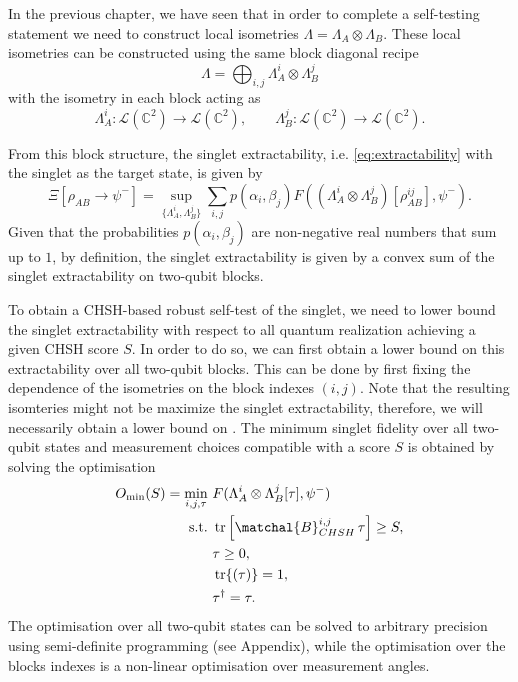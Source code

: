 In the previous chapter, we have seen that in order to complete a self-testing statement we need to construct local isometries $\Lambda = \Lambda_A \otimes \Lambda_B$.
These local isometries can be constructed using the same block diagonal recipe 
\begin{equation}
		\Lambda = \bigoplus_{i,j} \Lambda_A^i \otimes \Lambda_B^j
	\label{eq:}
\end{equation}
with the isometry in each block acting as
\begin{equation}
	\Lambda_A^i: \mathcal{L}(\mathds{C}^2) \rightarrow \mathcal{L}(\mathds{C}^2), \qquad \Lambda_B^j: \mathcal{L}(\mathds{C}^2) \rightarrow \mathcal{L}(\mathds{C}^2).
	\label{eq:}
\end{equation}

From this block structure, the singlet extractability, i.e. \eqref{eq:extractability} with the singlet as the target state, is given by
\begin{equation}
	\Xi [\rho_{AB} \rightarrow \psi^{-}] = \sup_{\{\Lambda_A^i,\Lambda_B^j\}} \sum_{i,j} p(\alpha_i,\beta_j) F((\Lambda_A^i \otimes \Lambda_B^j)[\rho_{AB}^{ij}],\psi^{-}).
	\label{eq:block_extractability}
\end{equation}
Given that the probabilities $p(\alpha_i,\beta_j)$ are non-negative real numbers that sum up to $1$, by definition, the singlet extractability is given by a convex sum of the singlet extractability on two-qubit blocks.

\medbreak

To obtain a CHSH-based robust self-test of the singlet, we need to lower bound the singlet extractability with respect to all quantum realization achieving a given CHSH score $S$.
In order to do so, we can first obtain a lower bound on this extractability over all two-qubit blocks.
This can be done by first fixing the dependence of the isometries on the block indexes $(i,j)$.
Note that the resulting isomteries might not be maximize the singlet extractability, therefore, we will necessarily obtain a lower bound on .
The minimum singlet fidelity over all two-qubit states and measurement choices compatible with a score $S$ is obtained by solving the optimisation
\begin{equation}
	\begin{split}
		O_{\min}(S)=\min_{i, j, \tau} \-\ & F(\Lambda_A^i \otimes\Lambda_B^j [\tau] ,\psi^-)\\
		\text{s.t.} \-\ &\trr{\matchal{B}_{CHSH}^{i,j}\, \tau} \geq S,\\
		& \tau \geq 0,\\
		& \tr{(\tau)} =1,\\
		& \tau^\dag = \tau.
	\end{split}
	\label{eq:sdp_extractability}
\end{equation}
The optimisation over all two-qubit states can be solved to arbitrary precision using semi-definite programming (see Appendix), while the optimisation over the blocks indexes is a non-linear optimisation over measurement angles.

